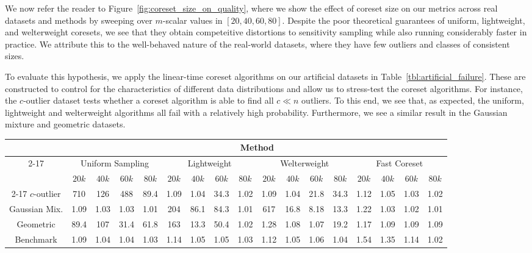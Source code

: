 We now refer the reader to Figure~\ref{fig:coreset_size_on_quality}, where we show the effect of coreset size on our metrics across real datasets and methods by
sweeping over $m$-scalar values in $[20, 40, 60, 80]$. Despite the poor theoretical guarantees of uniform, lightweight, and welterweight coresets, we see that
they obtain competeitive distortions to sensitivity sampling while also running considerably faster in practice. We attribute this to the well-behaved nature of
the real-world datasets, where they have few outliers and classes of consistent sizes.

To evaluate this hypothesis, we apply the linear-time coreset algorithms on our artificial datasets in Table~\ref{tbl:artificial_failure}. These are constructed
to control for the characteristics of different data distributions and allow us to stress-test the coreset algorithms. For instance, the $c$-outlier dataset
tests whether a coreset algorithm is able to find all $c \ll n$ outliers. To this end, we see that, as expected, the uniform, lightweight and welterweight
algorithms all fail with a relatively high probability. Furthermore, we see a similar result in the Gaussian mixture and geometric datasets.

\begin{table*}[htbp]
    \centering
    \small
    \begin{tabular}{|c|cccc|cccc|cccc|cccc|}
        \hline
        & \multicolumn{16}{c|}{Method} \\
        \cline{2-17} & \multicolumn{4}{c|}{Uniform Sampling} & \multicolumn{4}{c|}{Lightweight} & \multicolumn{4}{c|}{Welterweight} & \multicolumn{4}{c|}{Fast Coreset} \\
        & $20k$ & $40k$ & $60k$ & $80k$ & $20k$ & $40k$ & $60k$ & $80k$ & $20k$ & $40k$ & $60k$ & $80k$ & $20k$ & $40k$ & $60k$ & $80k$ \\
        \cline{2-17}
        $c$-outlier & 710 & 126 & 488 & 89.4 & 1.09 & 1.04 & 34.3 & 1.02 & 1.09 & 1.04 & 21.8 & 34.3 & 1.12 & 1.05 & 1.03 & 1.02 \\
        Gaussian Mix. & 1.09 & 1.03 & 1.03 & 1.01 & 204 & 86.1 & 84.3 & 1.01 & 617 & 16.8 & 8.18 & 13.3 & 1.22 & 1.03 & 1.02 & 1.01 \\
        Geometric & 89.4 & 107 & 31.4 & 61.8 & 163 & 13.3 & 50.4 & 1.02 & 1.28 & 1.08 & 1.07 & 19.2 & 1.17 & 1.09 & 1.09 & 1.09 \\
        Benchmark & 1.09 & 1.04 & 1.04 & 1.03 & 1.14 & 1.05 & 1.05 & 1.03 & 1.12 & 1.05 & 1.06 & 1.04 & 1.54 & 1.35 & 1.14 & 1.02 \\
        \hline
    \end{tabular}
    \caption{Coreset distortions for each method on the artificial datasets. We report the results for coreset sizes $20k$-$80k$, with $k=100$ in all
    instances.}
    \label{tbl:artificial_failure}
\end{table*}

